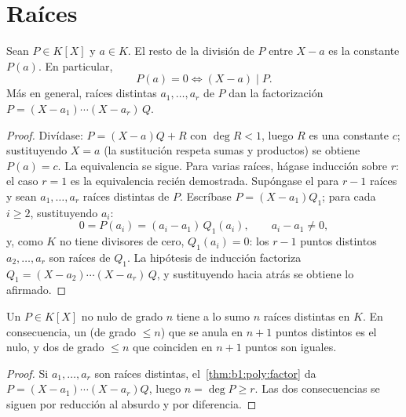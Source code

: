 \section{Raíces}

\begin{theorem}\label{thm:b1:poly:factor}
Sean $P \in K[X]$ y $a \in K$. El resto de la división de $P$ entre
$X - a$ es la constante $P(a)$. En particular,
\[
P(a) = 0 \iff (X - a) \mid P .
\]
Más en general, raíces distintas $a_1, \dots, a_r$ de $P$ dan la
factorización $P = (X - a_1)\cdots(X - a_r)\, Q$.
\end{theorem}

\begin{proof}
Divídase: $P = (X - a) Q + R$ con $\deg R < 1$, luego $R$ es una
constante $c$; sustituyendo $X = a$ (la sustitución respeta sumas y
productos) se obtiene $P(a) = c$. La equivalencia se sigue. Para varias
raíces, hágase inducción sobre $r$: el caso $r = 1$ es la equivalencia
recién demostrada. Supóngase el  para $r - 1$ raíces y sean
$a_1, \dots, a_r$ raíces distintas de $P$. Escríbase $P = (X - a_1)Q_1$;
para cada $i \geq 2$, sustituyendo $a_i$:
\[
0 = P(a_i) = (a_i - a_1)\,Q_1(a_i),
\qquad a_i - a_1 \neq 0 ,
\]
y, como $K$ no tiene divisores de cero, $Q_1(a_i) = 0$: los $r - 1$
puntos distintos $a_2, \dots, a_r$ son raíces de $Q_1$. La hipótesis de
inducción factoriza $Q_1 = (X - a_2)\cdots(X - a_r)\,Q$, y sustituyendo
hacia atrás se obtiene lo afirmado.
\end{proof}

\begin{corollary}\label{cor:b1:poly:nroots}
Un $P \in K[X]$ no nulo de grado $n$ tiene a lo sumo $n$ raíces
distintas en $K$. En consecuencia, un  (de grado $\leq n$)
que se anula en $n + 1$ puntos distintos es el  nulo, y dos
 de grado $\leq n$ que coinciden en $n+1$ puntos son iguales.
\end{corollary}

\begin{proof}
Si $a_1, \dots, a_r$ son raíces distintas, el~\cref{thm:b1:poly:factor}
da $P = (X-a_1)\cdots(X-a_r) Q$, luego $n = \deg P \geq r$. Las dos
consecuencias se siguen por reducción al absurdo y por diferencia.
\end{proof}

